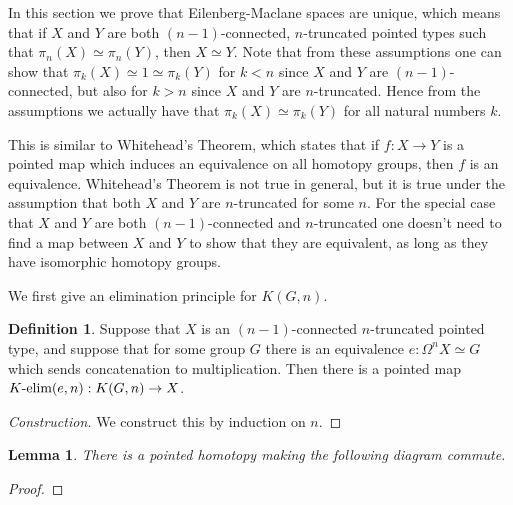 \documentclass{article}
\newcommand{\Kelim}{K\textnormal{-elim}}
\newtheorem{lemma}[theorem]{Lemma}
\theoremstyle{definition}
\newtheorem{definition}[theorem]{Definition}
\theoremstyle{remark}
\begin{document}
In this section we prove that Eilenberg-Maclane spaces are unique, which means that if $X$ and $Y$
are both $(n-1)$-connected, $n$-truncated pointed types such that $\pi_n(X)\simeq \pi_n(Y)$, then
$X\simeq Y$. Note that from these assumptions one can show that $\pi_k(X)\simeq 1\simeq \pi_k(Y)$
for $k < n$ since $X$ and $Y$ are $(n-1)$-connected, but also for $k > n$ since $X$ and $Y$ are
$n$-truncated. Hence from the assumptions we actually have that $\pi_k(X)\simeq\pi_k(Y)$ for all
natural numbers $k$.

This is similar to Whitehead's Theorem, which states that if $f : X \to Y$ is a pointed map
which induces an equivalence on all homotopy groups, then $f$ is an equivalence. Whitehead's Theorem
is not true in general, but it is true under the assumption that both $X$ and $Y$ are $n$-truncated
for some $n$. For the special case that $X$ and $Y$ are both $(n-1)$-connected and $n$-truncated one
doesn't need to find a map between $X$ and $Y$ to show that they are equivalent, as long as they
have isomorphic homotopy groups.

We first give an elimination principle for $K(G,n)$.
\begin{definition}
Suppose that $X$ is an $(n-1)$-connected $n$-truncated pointed type, and suppose that for some group
$G$ there is an equivalence $e : \Omega^n X \simeq G$ which sends concatenation to
multiplication. Then there is a pointed map $\Kelim(e, n) : K(G,n)\to X$.
\end{definition}
\begin{proof}[Construction]
  We construct this by induction on $n$.
\end{proof}

\begin{lemma}
There is a pointed homotopy making the following diagram commute.
\begin{center}
\end{center}

\end{lemma}
\begin{proof}
\end{proof}
\end{document}
